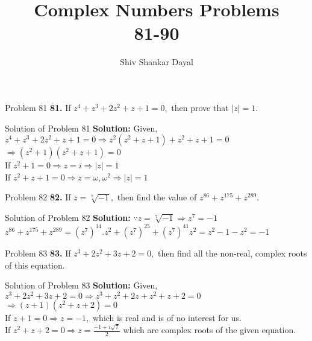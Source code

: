 \documentclass[aspectratio=169,8pt]{beamer}
\title{Complex Numbers Problems\\ 81-90}
\author[Shiv Shankar Dayal]{Shiv Shankar Dayal}
\begin{document}
\begin{frame}
  \titlepage
\end{frame}
\begin{frame}{Problem 81}
  \textbf{81.} If $z^4 + z^3 + 2z^2 + z + 1 = 0,$ then prove that $|z| = 1.$
\end{frame}
\begin{frame}{Solution of Problem 81}
  \textbf{Solution:} Given, $z^4 + z^3 + 2z^2 + z + 1 = 0 \Rightarrow z^2(z^2 + z + 1) + z^2 + z + 1 = 0$\\
  \vspace*{0.2cm}
  $\Rightarrow (z^2 + 1)(z^2 + z + 1) = 0$\\
  \vspace*{0.2cm}
  If $z^2 + 1 = 0 \Rightarrow z = i \Rightarrow |z| = 1$\\
  \vspace*{0.2cm}
  If $z^2 + z + 1 = 0 \Rightarrow z = \omega, \omega^2 \Rightarrow |z| = 1$
\end{frame}
\begin{frame}{Problem 82}
  \textbf{82.} If $z = \sqrt[7]{-1},$ then find the value of $z^{86} + z^{175} + z^{289}.$
\end{frame}
\begin{frame}{Solution of Problem 82}
  \textbf{Solution:} $\because z = \sqrt[7]{-1}\Rightarrow z^7 = -1$\\
  \vspace*{0.2cm}
  $z^{86} + z^{175} + z^{289} = (z^7)^{14}.z^2 + (z^7)^{25} + (z^7)^{41}z^2 = z^2 -1 -z^2 = -1$
\end{frame}
\begin{frame}{Problem 83}
  \textbf{83.} If $z^3 + 2z^2 + 3z + 2 = 0,$ then find all the non-real, complex roots of this equation.
\end{frame}
\begin{frame}{Solution of Problem 83}
  \textbf{Solution:} Given, $z^3 + 2z^2 + 3z + 2 = 0\Rightarrow z^3 + z^2 + 2z + z^2 + z + 2 = 0$\\
  \vspace*{0.2cm}
  $\Rightarrow (z + 1)(z^2 + z + 2) = 0$\\
  \vspace*{0.2cm}
  If $z + 1 = 0 \Rightarrow z = -1,$ which is real and is of no interest for us.\\
  \vspace*{0.2cm}
  If $z^2 + z + 2 = 0 \Rightarrow z = \frac{-1 + i\sqrt{7}}{2}$ which are complex roots of the given equation.
\end{frame}
\end{document}
